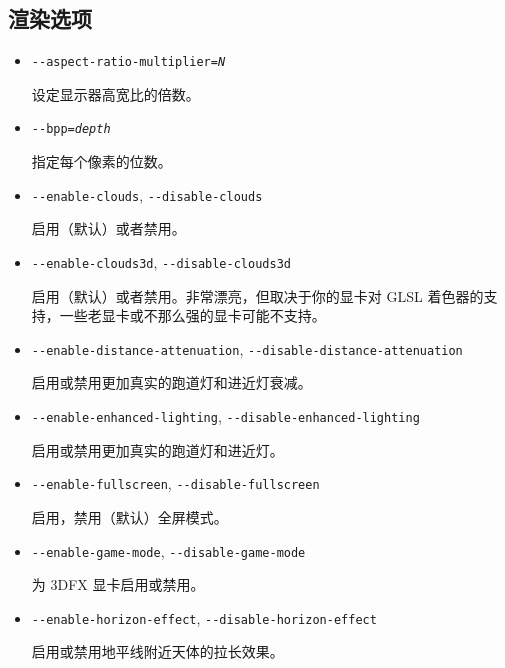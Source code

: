 \ifchinese
{
  \subsection{渲染选项}
 \begin{itemize}

  \item{\texttt{-$ $-aspect-ratio-multiplier={\it N}}}

    设定显示器高宽比的倍数。

\item{\texttt{-$ $-bpp={\it depth}}}

   指定每个像素的位数。

 \item{\texttt{-$ $-enable-clouds}, \texttt{-$ $-disable-clouds}}

   启用（默认）或者禁用。

\item{\texttt{-$ $-enable-clouds3d}, \texttt{-$ $-disable-clouds3d}}

  启用（默认）或者禁用。非常漂亮，但取决于你的显卡对 GLSL 着色器的支持，一些老显卡或不那么强的显卡可能不支持。

\item{\texttt{-$ $-enable-distance-attenuation}, \texttt{-$ $-disable-distance-attenuation}}

  启用或禁用更加真实的跑道灯和进近灯衰减。

\item{\texttt{-$ $-enable-enhanced-lighting}, \texttt{-$ $-disable-enhanced-lighting}}

  启用或禁用更加真实的跑道灯和进近灯。

 \item{\texttt{-$ $-enable-fullscreen}, \texttt{-$ $-disable-fullscreen}}

  启用，禁用（默认）全屏模式。

\item{\texttt{-$ $-enable-game-mode}, \texttt{-$ $-disable-game-mode}}

  为 3DFX 显卡启用或禁用。

\item{\texttt{-$ $-enable-horizon-effect}, \texttt{-$ $-disable-horizon-effect}}

  启用或禁用地平线附近天体的拉长效果。


\end{itemize}}

